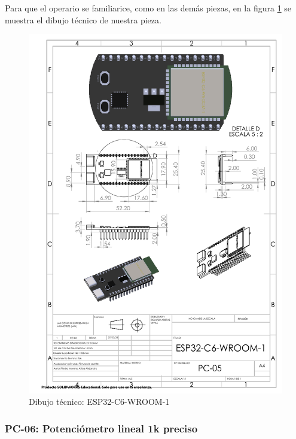     Para que el operario se familiarice, como en las demás piezas, en la figura \ref{fig:esp} se muestra el dibujo técnico de nuestra pieza.
    \begin{figure}[H]
        \centering
        \includegraphics[trim = {7mm 1mm 1mm 1mm},clip,scale=0.4]{22/Img/esp32Dibujo.pdf}
        \caption{Dibujo técnico: ESP32-C6-WROOM-1}
        \label{fig:esp}
    \end{figure}
    
    \subsubsection{PC-06: Potenciómetro lineal 1k preciso }
    
